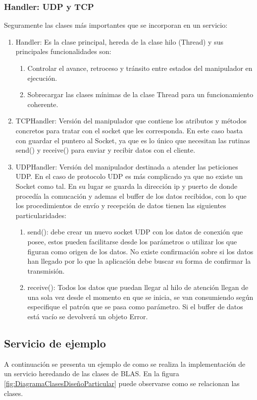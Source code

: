 \documentclass[a4paper,spanish,12pt]{book}
\begin{document}
\subsubsection{Handler: UDP y TCP}
Seguramente las clases más importantes que se incorporan en un servicio:
\begin{enumerate}
	\item Handler: Es la clase principal, hereda de la clase hilo (Thread) y sus principales funcionalidades son:
		\begin{enumerate}
			\item Controlar el avance, retroceso y tránsito entre estados del manipulador en ejecución.
			\item Sobrecargar las clases mínimas de la clase Thread para un funcionamiento coherente.
		\end{enumerate}
	\item TCPHandler: Versión del manipulador que contiene los atributos y m\'etodos concretos para tratar con el socket que les corresponda. En este caso basta con guardar el puntero al Socket, ya que es lo único que necesitan las rutinas send() y receive() para enviar y recibir datos con el cliente.
	\item UDPHandler: Versión del manipulador destinada a atender las peticiones UDP. En el caso de protocolo UDP es más complicado ya que no existe un Socket como tal. En su lugar se guarda la dirección ip y puerto de donde procedía la comucación y ademas el buffer de los datos recibidos, con lo que los procedimientos de envío y recepción de datos tienen las siguientes particularidades:
		\begin{enumerate}
			\item send(): debe crear un nuevo socket UDP con los datos de conexión que posee, estos pueden facilitarse desde los parámetros o utilizar los que figuran como origen de los datos. No existe confirmación sobre si los datos han llegado por lo que la aplicación debe buscar su forma de confirmar la transmisión.
			\item receive(): Todos los datos que puedan llegar al hilo de atención llegan de una sola vez desde el momento en que se inicia, se van consumiendo según especifique el patrón que se pasa como parámetro. Si el buffer de datos está vacío se devolverá un objeto Error.
		\end{enumerate}
\end{enumerate}
\subsection{Servicio de ejemplo}
A continuación se presenta un ejemplo de como se realiza la implementación de un servicio heredando de las clases de BLAS. En la figura \ref{fig:DiagramaClasesDiseñoParticular} puede observarse como se relacionan las clases.
\end{document}
